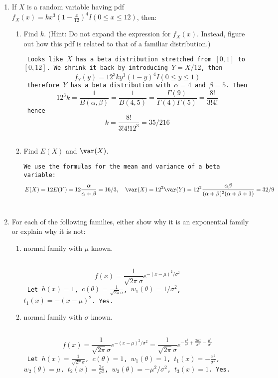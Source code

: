 \documentclass[12pt]{article}
\begin{document}
\begin{enumerate}
\item If $X$ is a random variable having
pdf $f_X(x) = k x^{3}(1-\frac{x}{12})^4 I(0\le x \le 12)$,
then:
  \begin{enumerate}
  \item Find $k$. (Hint:  Do not expand the expression for $f_X(x)$.
Instead, figure out how this pdf is related to that of a familiar distribution.)

\texttt{%
Looks like $X$ has a beta distribution stretched from $[0,1]$ to
$[0,12]$. We shrink it back by introducing $Y = X/12$, then
\[
f_Y(y) = 12^3 k y^3 (1 - y)^4 I(0 \le y \le 1)
\]
therefore $Y$ has a beta distribution with $\alpha = 4$ and $\beta = 5$.
Then
\[
12^3 k
= \frac{1}{B(\alpha,\beta)}
= \frac{1}{B(4, 5)}
= \frac{\Gamma(9)}{\Gamma(4)\Gamma(5)}
= \frac{8!}{3! 4!}
\]
hence
\[
k = \frac{8!}{3! 4! 12^3} = 35/216
\]
}

  \item Find $E(X)$ and $\var(X)$.

  \texttt{We use the formulas for the mean and variance of
  a beta variable:
  \[
  E(X) = 12 E(Y) = 12\frac{\alpha}{\alpha + \beta} = 16/3,
  \quad
  \var(X)
  = 12^2 \var(Y)
  = 12^2 \frac{\alpha\beta}{(\alpha+\beta)^2 (\alpha + \beta + 1)}
  = 32/9
  \]
  }

  \end{enumerate}

\item For each of the following families, either show why it is
an exponential family or explain why it is not:

  \begin{enumerate}
  \item normal family with $\mu$ known.

  \texttt{%
  \[
  f(x) = \frac{1}{\sqrt{2\pi} \sigma} e^{-(x - \mu)^2/\sigma^2}
  \]
  Let $h(x) = 1$, $c(\theta) = \frac{1}{\sqrt{2\pi}\sigma}$,
    $w_1(\theta) = 1/\sigma^2$, $t_1(x) = -(x - \mu)^2$.
    Yes.
  }

  \item normal family with $\sigma$ known.

  \texttt{%
  \[
  f(x)
  = \frac{1}{\sqrt{2\pi} \sigma} e^{-(x - \mu)^2/\sigma^2}
  = \frac{1}{\sqrt{2\pi}\sigma}
    e^{-\frac{x^2}{\sigma^2} + \frac{2\mu x}{\sigma^2} -
    \frac{\mu^2}{\sigma^2}}
  \]
  Let
    $h(x) = \frac{1}{\sqrt{2\pi}\sigma}$,
    $c(\theta) = 1$,
    $w_1(\theta) = 1$,
    $t_1(x) = -\frac{x^2}{\sigma^2}$,
    $w_2(\theta) = \mu$,
    $t_2(x) = \frac{2x}{\sigma^2}$,
    $w_3(\theta) = -\mu^2/\sigma^2$,
    $t_3(x) = 1$.
    Yes.
  }



\end{enumerate}
\end{enumerate}
\end{document}
